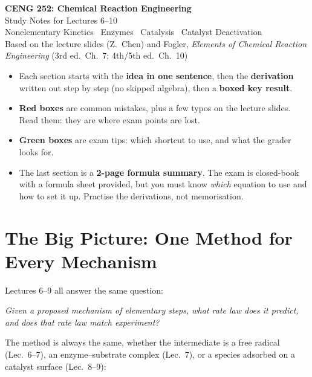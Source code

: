 \documentclass[11pt]{article}
\begin{document}
\begin{center}
{\LARGE\bfseries CENG 252: Chemical Reaction Engineering}\\[4pt]
{\Large Study Notes for Lectures 6--10}\\[4pt]
{\large Nonelementary Kinetics \textbullet\ Enzymes \textbullet\ Catalysis \textbullet\ Catalyst Deactivation}\\[6pt]
{\small Based on the lecture slides (Z.~Chen) and Fogler, \emph{Elements of Chemical Reaction Engineering}
(3rd ed.\ Ch.~7; 4th/5th ed.\ Ch.~10)}
\end{center}

\begin{summarybox}
\begin{itemize}
\item Each section starts with the \textbf{idea in one sentence}, then the \textbf{derivation} written out step by step
(no skipped algebra), then a \textbf{boxed key result}.
\item \textcolor{warnred}{\textbf{Red boxes}} are common mistakes, plus a few typos on the lecture slides.
Read them: they are where exam points are lost.
\item \textcolor{tipgreen}{\textbf{Green boxes}} are exam tips: which shortcut to use, and what the grader looks for.
\item The last section is a \textbf{2-page formula summary}. The exam is closed-book with a formula sheet provided, but you
must know \emph{which} equation to use and how to set it up. Practise the derivations, not memorisation.
\end{itemize}
\end{summarybox}

\tableofcontents
\newpage

\section{The Big Picture: One Method for Every Mechanism}
Lectures 6--9 all answer the same question:
\begin{center}
\emph{Given a proposed mechanism of elementary steps, what rate law does it predict, and does that rate law match experiment?}
\end{center}
The method is always the same, whether the intermediate is a free radical (Lec.~6--7), an enzyme--substrate complex
(Lec.~7), or a species adsorbed on a catalyst surface (Lec.~8--9):
\end{document}
